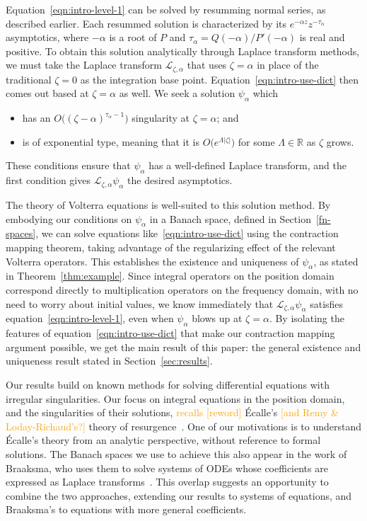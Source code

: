 \documentclass[review]{siamart220329}
\newcommand{\R}{\mathbb{R}}
\newcommand{\laplace}{\mathcal{L}}
\begin{document}
Equation~\eqref{eqn:intro-level-1} can be solved by resumming normal series, as described earlier. Each resummed solution is characterized by its $e^{-\alpha z} z^{-\tau_\alpha}$ asymptotics, where $-\alpha$ is a root of $P$ and $\tau_\alpha = Q(-\alpha)/P'(-\alpha)$ is real and positive. To obtain this solution analytically through Laplace transform methods, we must take the Laplace transform $\laplace_{\zeta,\alpha}$ that uses $\zeta = \alpha$ in place of the traditional $\zeta = 0$ as the integration base point. Equation~\eqref{eqn:intro-use-dict} then comes out based at $\zeta = \alpha$ as well. We seek a solution $\psi_\alpha$ which
\begin{itemize}
\item has an $O\big((\zeta - \alpha)^{\tau_\alpha-1}\big)$ singularity at $\zeta = \alpha$; and
\item is of exponential type, meaning that it is $O\big(e^{\Lambda|\zeta|}\big)$ for some $\Lambda \in \R$ as $\zeta$ grows.
\end{itemize}
These conditions ensure that $\psi_\alpha$ has a well-defined Laplace transform, and the first condition gives $\laplace_{\zeta, \alpha} \psi_\alpha$ the desired asymptotics.

The theory of Volterra equations is well-suited to this solution method. By embodying our conditions on $\psi_\alpha$ in a Banach space, defined in Section~\ref{fn-spaces}, we can solve equations like~\eqref{eqn:intro-use-dict} using the contraction mapping theorem, taking advantage of the regularizing effect of the relevant Volterra operators. This establishes the existence and uniqueness of $\psi_\alpha$, as stated in Theorem~\ref{thm:example}. Since integral operators on the position domain correspond directly to multiplication operators on the frequency domain, with no need to worry about initial values, we know immediately that $\laplace_{\zeta, \alpha} \psi_\alpha$ satisfies equation~\eqref{eqn:intro-level-1}, even when $\psi_\alpha$ blows up at $\zeta = \alpha$. By isolating the features of equation~\eqref{eqn:intro-use-dict} that make our contraction mapping argument possible, we get the main result of this paper: the general existence and uniqueness result stated in Section~\ref{sec:results}.

Our results build on known methods for solving differential equations with irregular singularities. Our focus on integral equations in the position domain, and the singularities of their solutions, \textcolor{orange}{recalls [reword]} \'{E}calle's \textcolor{orange}{[and Remy \& Loday-Richaud's?]} theory of resurgence~\cite{EcalleIII}. One of our motivations is to understand \'{E}calle's theory from an analytic perspective, without reference to formal solutions. The Banach spaces we use to achieve this also appear in the work of Braaksma, who uses them to solve systems of ODEs whose coefficients are expressed as Laplace transforms~\cite{braaksma2006laplace}. This overlap suggests an opportunity to combine the two approaches, extending our results to systems of equations, and Braaksma's to equations with more general coefficients.
\end{document}
